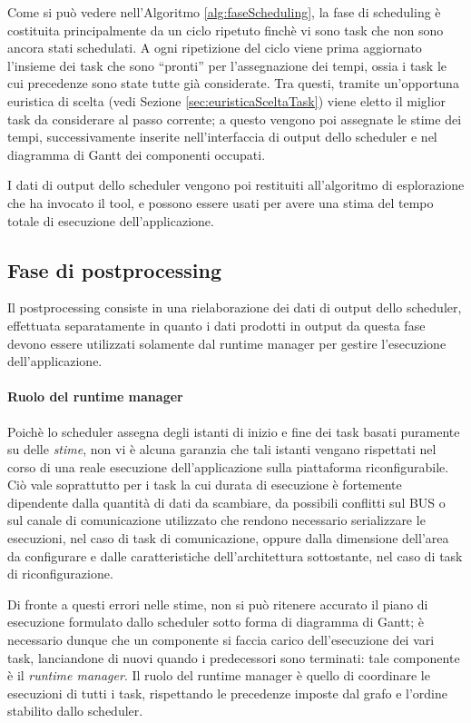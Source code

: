 Come si può vedere nell'Algoritmo \ref{alg:faseScheduling}, la fase di 
scheduling è costituita principalmente da un ciclo ripetuto finchè vi sono 
task che non sono ancora stati schedulati. A ogni ripetizione del ciclo viene 
prima aggiornato l'insieme dei task che sono ``pronti'' per l'assegnazione dei 
tempi, ossia i task le cui precedenze sono state tutte già considerate. Tra 
questi, tramite un'opportuna euristica di scelta (vedi Sezione 
\ref{sec:euristicaSceltaTask}) viene eletto il miglior task da considerare al 
passo corrente; a questo vengono poi assegnate le stime dei tempi, 
successivamente inserite nell'interfaccia di output dello scheduler e nel 
diagramma di Gantt dei componenti occupati.

I dati di output dello scheduler vengono poi restituiti all'algoritmo di 
esplorazione che ha invocato il tool, e possono essere usati per avere una 
stima del tempo totale di esecuzione dell'applicazione.


\subsection{Fase di postprocessing}
Il postprocessing consiste in una rielaborazione dei dati di output dello 
scheduler, effettuata separatamente in quanto i dati prodotti in output da 
questa fase devono essere utilizzati solamente dal runtime manager per gestire 
l'esecuzione dell'applicazione.

\paragraph{Ruolo del runtime manager}
Poichè lo scheduler assegna degli istanti di inizio e fine dei task basati 
puramente su delle \emph{stime}, non vi è alcuna garanzia che tali istanti 
vengano rispettati nel corso di una reale esecuzione dell'applicazione sulla 
piattaforma riconfigurabile. Ciò vale soprattutto per i task la cui
durata di esecuzione è fortemente dipendente dalla quantità di dati da 
scambiare, da possibili conflitti sul BUS o sul canale di comunicazione 
utilizzato che rendono necessario serializzare le esecuzioni, nel caso di 
task di comunicazione, oppure dalla dimensione dell'area da configurare e 
dalle caratteristiche dell'architettura sottostante, nel caso di task di 
riconfigurazione.

Di fronte a questi errori nelle stime, non si può ritenere accurato il piano di 
esecuzione formulato dallo scheduler sotto forma di diagramma di Gantt; è 
necessario dunque che un componente si faccia carico dell'esecuzione dei vari 
task, lanciandone di nuovi quando i predecessori sono terminati: tale 
componente è il \emph{runtime manager}. Il ruolo del runtime manager è quello 
di coordinare le esecuzioni di tutti i task, rispettando le precedenze imposte 
dal grafo e l'ordine stabilito dallo scheduler.

